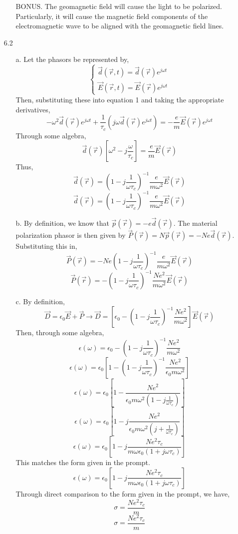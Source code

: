 \documentclass[12pt]{article}
\begin{document}
\begin{enumerate}
\begin{enumerate}
\begin{enumerate}
		\end{enumerate}

		\item [BONUS.]
		The geomagnetic field will cause the light to be polarized.
		Particularly, it will cause the magnetic field components of the electromagnetic wave to be aligned with the geomagnetic field lines.



	\end{enumerate}

	\item [6.2]
	\begin{enumerate}
		\item [a.]
		Let the phasors be represented by,
		\[\begin{cases}
			\vec d(\vec r, t)=\vec d(\vec r)e^{j\omega t} \\ 
			\vec E(\vec r, t)=\vec E(\vec r)e^{j\omega t}	
		\end{cases}\]
		Then, substituting these into equation 1 and taking the appropriate derivatives,
		\[-\omega^2\vec d(\vec r)e^{j\omega t}+\frac{1}{\tau_c}\left(j\omega \vec d(\vec r)e^{j\omega t}\right)=-\frac{e}{m}\vec E(\vec r)e^{j\omega t}\]
		Through some algebra,
		\[\vec d(\vec r)\left[\omega^2-j\frac{\omega}{\tau_c}\right]=\frac{e}{m}\vec E(\vec r)\]
		Thus,
		\[\vec d(\vec r)=\left(1-j\frac{1}{\omega\tau_c}\right)^{-1}\frac{e}{m\omega^2}\vec E(\vec r)\]
		\[\boxed{\vec d(\vec r)=\left(1-j\frac{1}{\omega\tau_c}\right)^{-1}\frac{e}{m\omega^2}\vec E(\vec r)}\]

		\item [b.]
		By definition, we know that $\vec p(\vec r)=-e\vec d(\vec r)$.
		The material polarization phasor is then given by $\vec P(\vec r)=N\vec p(\vec r)=-Ne\vec d(\vec r)$.
		Substituting this in,
		\[\vec P(\vec r)=-Ne \left(1-j\frac{1}{\omega\tau_c}\right)^{-1}\frac{e}{m\omega^2}\vec E(\vec r)\]
		\[\boxed{\vec P(\vec r)=- \left(1-j\frac{1}{\omega\tau_c}\right)^{-1}\frac{Ne^2}{m\omega^2}\vec E(\vec r)}\]

		\item [c.]
		By definition,
		\[\vec D = \epsilon_0 \vec E + \vec P \to \vec D =\left[\epsilon_0-\left(1-j\frac{1}{\omega \tau_c}\right)^{-1}\frac{Ne^2}{m\omega^2}\right]\vec E(\vec r)\]
		Then, through some algebra,
		\[\epsilon(\omega)=\epsilon_0-\left(1-j\frac{1}{\omega \tau_c}\right)^{-1}\frac{Ne^2}{m\omega^2}\]
		\[\epsilon(\omega)=\epsilon_0\left[1-\left(1-j\frac{1}{\omega \tau_c}\right)^{-1}\frac{Ne^2}{\epsilon_0m\omega^2}\right]\]
		\[\epsilon(\omega)=\epsilon_0\left[1-\frac{Ne^2}{\epsilon_0m\omega^2(1-j\frac{1}{\omega \tau_c})}\right]\]
		\[\epsilon(\omega)=\epsilon_0\left[1-j\frac{Ne^2}{\epsilon_0m\omega^2(j+\frac{1}{\omega \tau_c})}\right]\]
		\[\epsilon(\omega)=\epsilon_0\left[1-j\frac{Ne^2\tau_c}{m\omega\epsilon_0(1+j\omega \tau_c)}\right]\]
		This matches the form given in the prompt.
		\[\boxed{\epsilon(\omega)=\epsilon_0\left[1-j\frac{Ne^2\tau_c}{m\omega\epsilon_0(1+j\omega \tau_c)}\right]}\]
		Through direct comparison to the form given in the prompt, we have,
		\[\sigma = \frac{Ne^2\tau_c}{m}\]
		\[\boxed{\sigma = \frac{Ne^2\tau_c}{m}}\]


\end{enumerate}
\end{enumerate}
\end{document}
